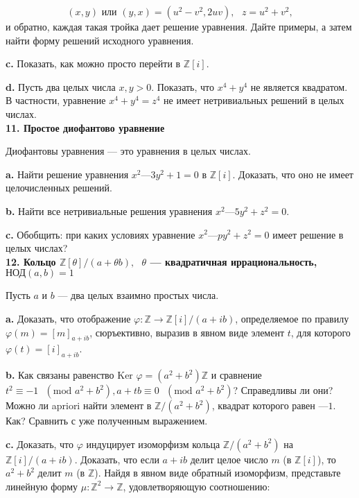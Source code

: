\documentclass{mai_book}
\begin{document}
\[
(x,y) \text{ или } (y,x) = (u^2-v^2, 2uv), \text{ } z=u^2+v^2,
\]
и обратно, каждая такая тройка дает решение уравнения. Дайте 
примеры, а затем найти форму решений исходного уравнения.

\textbf{c.} Показать, как можно просто перейти в $\mathbb{Z}[i]$.

\textbf{d.} Пусть два целых числа $x, y > 0$. Показать, что $x^4 + y^4$ не является квадратом. В частности, уравнение $x^4 + y^4 = z^4$ не имеет 
нетривиальных решений в целых числах.
\\

\noindent \textbf{11. Простое диофантово уравнение}

Диофантовы уравнения — это уравнения в целых числах.

\textbf{a.} Найти решение уравнения $x^2 — 3 y^2 + 1 = 0$ в $\mathbb{Z}[i]$. Доказать, что оно не имеет целочисленных решений.

\textbf{b.} Найти все нетривиальные решения уравнения $x^2 — 5 y^2 + z^2 = 0$.

\textbf{c.} Обобщить: при каких условиях уравнение $x^2 —py^2 + z^2 = 0$ имеет решение в целых числах?
\\

\noindent \textbf{12. Кольцо $\mathbb{Z}[\theta] / (a + \theta b), \text{ } \theta$ — квадратичная иррациональность,} \\ $\text{НОД}(a,b) = 1$

Пусть $a$ и $b$ — два целых взаимно простых числа.

\textbf{a.} Доказать, что отображение $\varphi:\mathbb{Z}\to\mathbb{Z}[i]/(a+ib)$, определяемое по правилу $\varphi(m)=[m]_{a+ib}$, сюръективно, выразив в явном виде элемент $t$, для которого $\varphi(t)=[i]_{a+ib}$.

\textbf{b.} Как связаны равенство $\text{Ker }\varphi=(a^2+b^2)\mathbb{Z}$ и сравнение $t^2\equiv-1 \text{ } (\text{mod } a^2+b^2), a+tb\equiv0 \text{ } (\text{mod } a^2+b^2)$? Справедливы ли они? Можно ли
apriori найти элемент в $\mathbb{Z}/(a^2 + b^2)$, квадрат которого равен $—1$. Как? Сравнить с уже полученным выражением.

\textbf{c.} Доказать, что $\varphi$ индуцирует изоморфизм кольца $\mathbb{Z}/(a^2 + b^2)$ на $\mathbb{Z}[i]/(a+ib)$. Доказать, что если $a + ib$ делит целое число $m$ (в $\mathbb{Z}[i]$), то $a^2 + b^2$ делит $m$ (в $\mathbb{Z}$). Найдя в явном виде обратный изоморфизм, представьте линейную форму $\mu:\mathbb{Z}^2\to\mathbb{Z}$, удовлетворяющую соотношению:
\end{document}
